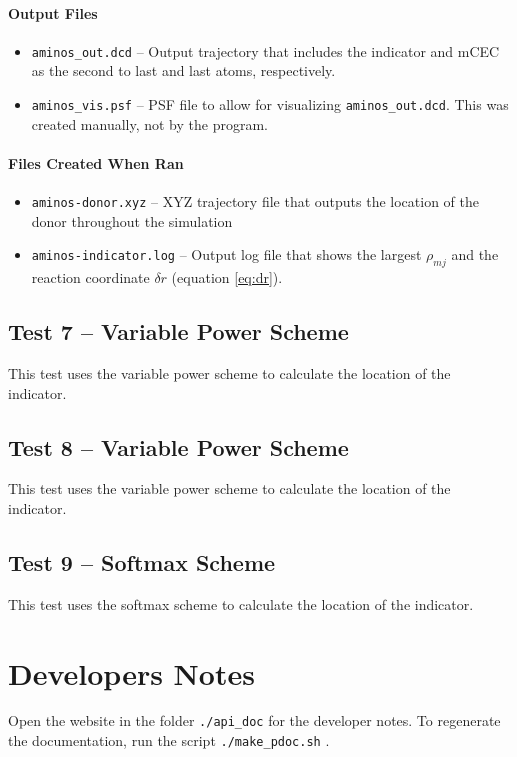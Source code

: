 \documentclass{article}
\begin{document}
\paragraph{Output Files}
\begin{itemize}
\item \texttt{aminos\_out.dcd} -- Output trajectory that includes the indicator and mCEC as the second to last and last atoms, respectively.
\item \texttt{aminos\_vis.psf} -- PSF file to allow for visualizing \texttt{aminos\_out.dcd}. This was created manually, not by the program.
\end{itemize}

\paragraph{Files Created When Ran}
\begin{itemize}
\item \texttt{aminos-donor.xyz} -- XYZ trajectory file that outputs the location of the donor throughout the simulation
\item \texttt{aminos-indicator.log} -- Output log file that shows the largest $\rho_{mj}$ and the reaction coordinate $\delta r$ (equation \ref{eq:dr}).
\end{itemize}

\subsection{Test 7 -- Variable Power Scheme}
This test uses the variable power scheme to calculate the location of the indicator.

\subsection{Test 8 -- Variable Power Scheme}
This test uses the variable power scheme to calculate the location of the indicator.

\subsection{Test 9 -- Softmax Scheme}
This test uses the softmax scheme to calculate the location of the indicator.

\section{Developers Notes}
Open the website in the folder \texttt{./api\_doc} for the developer notes.
To regenerate the documentation, run the script \texttt{./make\_pdoc.sh} .


\end{document}
